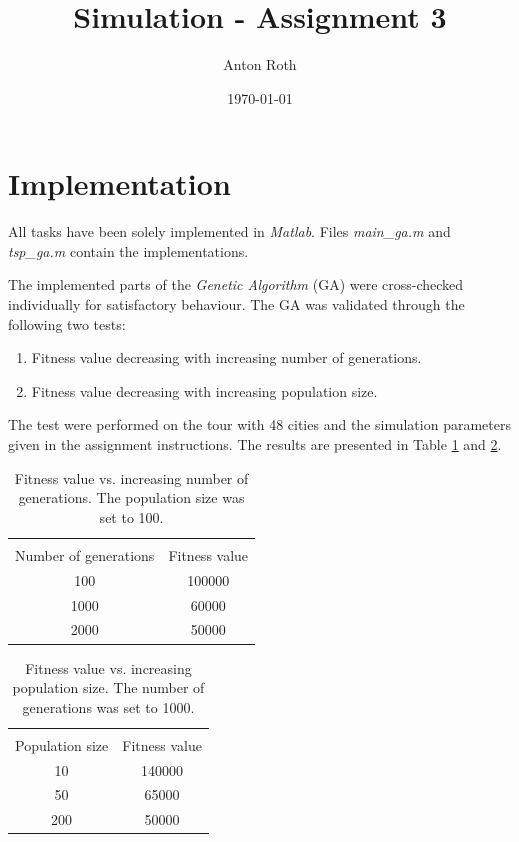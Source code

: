 \documentclass[]{article}
\title{Simulation - Assignment 3}
\author{Anton Roth}
\date{\today}
\begin{document}
\begin{titlepage}
  \maketitle
  \thispagestyle{empty}
\end{titlepage}

\section*{Implementation}
All tasks have been solely implemented in {\it Matlab}. Files \textit{main\_ga.m} and \textit{tsp\_ga.m} contain the implementations.

The implemented parts of the {\it Genetic Algorithm} (GA) were cross-checked individually for satisfactory behaviour.
The GA was validated through the following two tests:
\begin{enumerate}
  \item Fitness value decreasing with increasing number of generations.
  \item Fitness value decreasing with increasing population size.
\end{enumerate}
The test were performed on the tour with 48 cities and the simulation parameters given in the assignment instructions.
The results are presented in Table \ref{tab:val1} and \ref{tab:val2}.
\begin{table}[H]
  \centering
  \caption{Fitness value vs. increasing number of generations. The population size was set to 100.}
  \begin{tabular}{|c|c|}
    \hline \\
    Number of generations & Fitness value \\ \hline
    100 & 100000 \\ \hline
    1000 & 60000 \\ \hline
    2000 & 50000 \\ \hline
  \end{tabular}
  \label{tab:val1}
\end{table}

\begin{table}[H]
  \centering
  \caption{Fitness value vs. increasing population size. The number of generations was set to 1000.}
  \begin{tabular}{|c|c|}
    \hline \\
    Population size & Fitness value \\ \hline
    10 & 140000 \\ \hline
    50 & 65000 \\ \hline
    200 & 50000 \\ \hline
  \end{tabular}
  \label{tab:val2}
\end{table}
\end{document}
